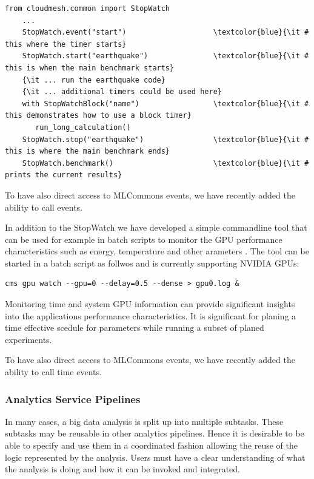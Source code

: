 \documentclass[utf8]{FrontiersinVancouver} %
\begin{document}
{\footnotesize
\begin{Verbatim}[commandchars=\\\{\}]
    from cloudmesh.common import StopWatch 
    ...
    StopWatch.event("start")                    \textcolor{blue}{\it # this where the timer starts}
    StopWatch.start("earthquake")               \textcolor{blue}{\it # this is when the main benchmark starts}
    {\it ... run the earthquake code}
    {\it ... additional timers could be used here}
    with StopWatchBlock("name")                 \textcolor{blue}{\it # this demonstrates how to use a block timer}
       run_long_calculation()
    StopWatch.stop("earthquake")                \textcolor{blue}{\it # this is where the main benchmark ends}
    StopWatch.benchmark()                       \textcolor{blue}{\it # prints the current results}
\end{Verbatim}
}

To have also direct access to MLCommons events, we have recently added
the ability to call events.


In addition to the StopWatch we have developed a simple commandline
tool that can be used for example in batch scripts to monitor the GPU
performance characteristics such as energy, temperature and other
arameters \citep{cloudmesh-gpu}. The tool can be started in a batch
script as follwos and is currently supporting NVIDIA GPUs:

{\footnotesize
\begin{Verbatim}[commandchars=\\\{\}]
    cms gpu watch --gpu=0 --delay=0.5 --dense > gpu0.log &
\end{Verbatim}
}


Monitoring time and system GPU information can provide significant
insights into the applications performance characteristics. It is
significant for planing a time effective scedule for parameters while
running a subset of planed experiments.

To have also direct access to MLCommons events, we have recently added
the ability to call time events.


\subsubsection{Analytics Service Pipelines}

In many cases, a big data analysis is split up into multiple
subtasks. These subtasks may be reusable in other analytics
pipelines. Hence it is desirable to be able to specify and use them in
a coordinated fashion allowing the reuse of the logic represented by
the analysis. Users must have a clear understanding of what the
analysis is doing and how it can be invoked and integrated.
\end{document}
